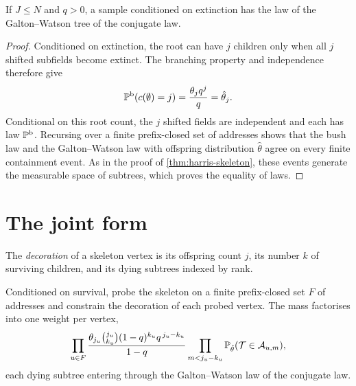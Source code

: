\begin{theorem}
\label{thm:harris-bushes}
\leanok
If $J\leq N$ and $q>0$, a sample conditioned on extinction has the law of the Galton--Watson
tree of the conjugate law.
\end{theorem}

\begin{proof}
\leanok
Conditioned on extinction, the root can have $j$ children only when all $j$ shifted
subfields become extinct. The branching property and independence therefore give
\[
  \mathbb{P}^{\mathrm b}(c(\emptyset)=j)
  =\frac{\theta_jq^j}{q}=\hat\theta_j.
\]
Conditional on this root count, the $j$ shifted fields are independent and each has law
$\mathbb{P}^{\mathrm b}$. Recursing over a finite prefix-closed set of addresses shows that the
bush law and the Galton--Watson law with offspring distribution $\hat\theta$ agree on every
finite containment event. As in the proof of \cref{thm:harris-skeleton}, these events
generate the measurable space of subtrees, which proves the equality of laws.
\end{proof}

\section{The joint form}

\begin{definition}
\label{def:decoration}
\leanok
The \emph{decoration} of a skeleton vertex is its offspring count $j$, its number $k$ of
surviving children, and its dying subtrees indexed by rank.
\end{definition}

\begin{theorem}
\label{thm:harris-joint}
\leanok
Conditioned on survival, probe the skeleton on a finite prefix-closed set $F$ of addresses and
constrain the decoration of each probed vertex. The mass factorises into one weight per
vertex,
\[
  \prod_{u\in F}
  \frac{\theta_{j_u}\binom{j_u}{k_u}(1-q)^{k_u}q^{\,j_u-k_u}}{1-q}
  \prod_{m<j_u-k_u}\mathbb{P}_{\hat\theta}(\mathcal{T}\in\mathcal{A}_{u,m}),
\]
each dying subtree entering through the Galton--Watson law of the conjugate law.
\end{theorem}

